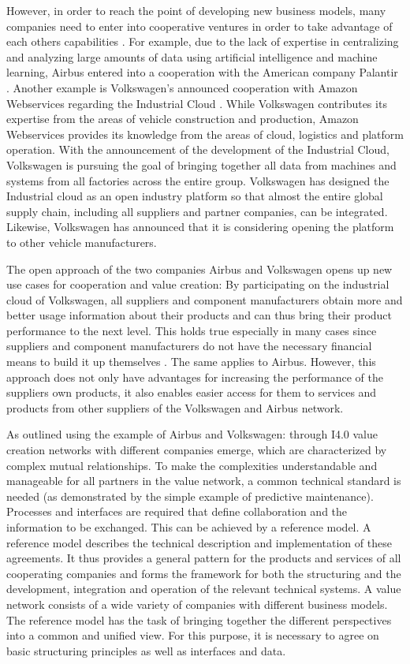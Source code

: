 However, in order to reach the point of developing new business models, many companies need to enter into cooperative ventures in order to take advantage of each others capabilities \cite{Russo2018HowCompetition}. For example, due to the lack of expertise in centralizing and analyzing large amounts of data using artificial intelligence and machine learning, Airbus entered into a cooperation with the American company Palantir \cite{Hanke2019AirbusWerden}. Another example is Volkswagen's announced cooperation with Amazon Webservices regarding the Industrial Cloud \cite{VolkswagenAG2019WirLive}. While Volkswagen contributes its expertise from the areas of vehicle construction and production, Amazon Webservices provides its knowledge from the areas of cloud, logistics and platform operation. With the announcement of the development of the Industrial Cloud, Volkswagen is pursuing the goal of bringing together all data from machines and systems from all factories across the entire group. Volkswagen has designed the Industrial cloud as an open industry platform so that almost the entire global supply chain, including all suppliers and partner companies, can be integrated. Likewise, Volkswagen has announced that it is considering opening the platform to other vehicle manufacturers.

The open approach of the two companies Airbus and Volkswagen opens up new use cases for cooperation and value creation: By participating on the industrial cloud of Volkswagen, all suppliers and component manufacturers obtain more and better usage information about their products and can thus bring their product performance to the next level. This holds true especially in many cases since suppliers and component manufacturers do not have the necessary financial means to build it up themselves \cite{Russo2018HowCompetition}. The same applies to Airbus. However, this approach does not only have advantages for increasing the performance of the suppliers own products, it also enables easier access for them to services and products from other suppliers of the Volkswagen and Airbus network. 

As outlined using the example of Airbus and Volkswagen: through \ac{I4.0} value creation networks with different companies emerge, which are characterized by complex mutual relationships. To make the complexities understandable and manageable for all partners in the value network, a common technical standard is needed (as demonstrated by the simple example of predictive maintenance). Processes and interfaces are required that define collaboration and the information to be exchanged. This can be achieved by a reference model. A reference model describes the technical description and implementation of these agreements. It thus provides a general pattern for the products and services of all cooperating companies and forms the framework for both the structuring and the development, integration and operation of the relevant technical systems. A value network consists of a wide variety of companies with different business models. The reference model has the task of bringing together the different perspectives into a common and unified view. For this purpose, it is necessary to agree on basic structuring principles as well as interfaces and data.

